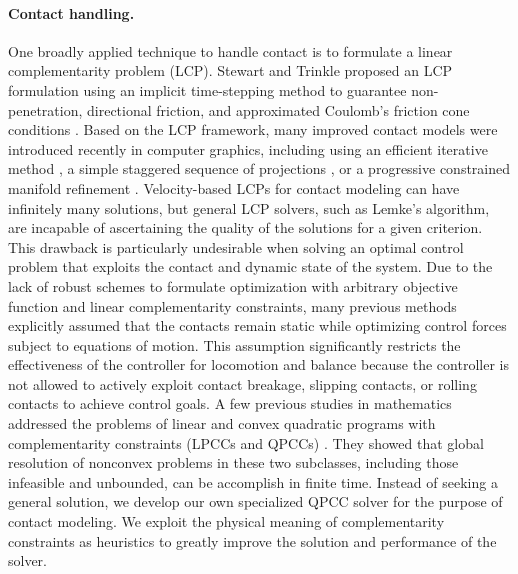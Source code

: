 \paragraph{Contact handling.} One broadly applied technique to handle contact is to formulate a
linear complementarity problem (LCP). Stewart and Trinkle proposed an
LCP formulation using an implicit time-stepping method to guarantee
non-penetration, directional friction, and approximated Coulomb's
friction cone conditions \cite{Stewart:1996}. Based on the LCP
framework, many improved contact models were introduced recently in
computer graphics, including using an efficient iterative method
\cite{Erleben:2007}, a simple staggered sequence of projections
\cite{Kaufman:2008}, or a progressive constrained manifold
refinement \cite{Otaduy:2009}. Velocity-based LCPs for contact
modeling can have infinitely many solutions, but general LCP solvers,
such as Lemke's algorithm, are incapable of ascertaining the quality of
the solutions for a given criterion. This drawback is particularly
undesirable when solving an optimal control problem that exploits the
contact and dynamic state of the system. Due to the lack of robust
schemes to formulate optimization with arbitrary objective function
and linear complementarity constraints, many previous methods
explicitly assumed that the contacts remain static
\cite{Abe:2007,Jain:2009,Kim:2011:DCO} while optimizing control forces
subject to equations of motion. This assumption significantly
restricts the effectiveness of the controller for locomotion and balance
because the controller is not allowed to actively exploit contact
breakage, slipping contacts, or rolling contacts to achieve control
goals. A few previous studies in mathematics addressed the problems of
linear and convex quadratic programs with complementarity constraints
(LPCCs and QPCCs) \cite{Hu:2008,Bai:2011}. They showed that global resolution of
nonconvex problems in these two subclasses, including those infeasible
and unbounded, can be accomplish in finite time. Instead of seeking
a general solution, we develop our own specialized QPCC solver for
the purpose of contact modeling. We exploit the physical meaning of
complementarity constraints as heuristics to greatly improve the
solution and performance of the solver.

